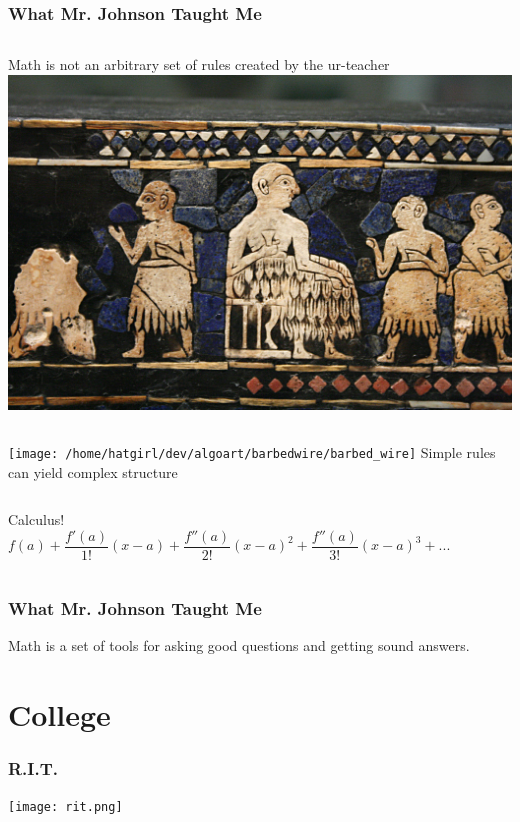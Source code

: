 \documentclass{beamer}
\theoremstyle{mystyle}
\begin{document}
\begin{frame}
\frametitle{What Mr. Johnson Taught Me}

\begin{columns}
		Math is not an arbitrary set of rules created by the ur-teacher\\
		\includegraphics[scale=0.027]{ur.jpg}
\end{columns} 
	\pause
\begin{columns}
		\texttt{[image: /home/hatgirl/dev/algoart/barbedwire/barbed\_wire]}		
		Simple rules can yield complex structure
\end{columns}
	\pause
\begin{columns}
		Calculus!
		\[f(a) + \frac{f'(a)}{1!}(x-a) + \frac{f''(a)}{2!}(x-a)^2 + \frac{f''(a)}{3!}(x-a)^3 + ... \]		
\end{columns}

\end{frame}

\begin{frame}
\frametitle{What Mr. Johnson Taught Me}
	Math is a set of tools for asking good questions and getting sound answers.

\end{frame}
\section{College}
\frame{\tableofcontents[currentsection]}

\begin{frame}
\frametitle{R.I.T.}

\begin{center}
	\texttt{[image: rit.png]}
\end{center}

\end{frame}
\end{document}
